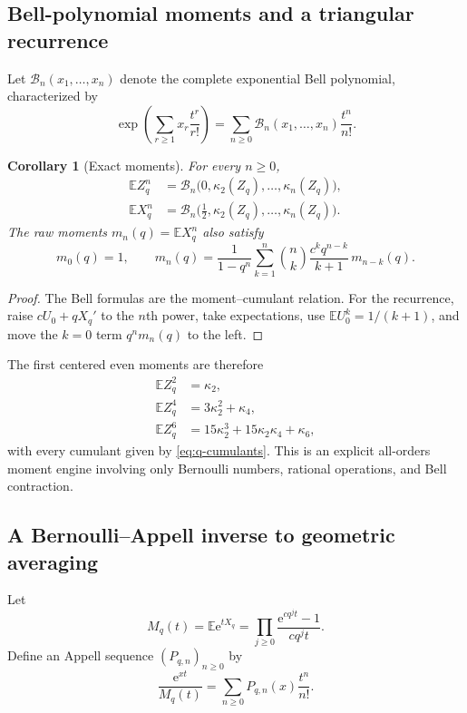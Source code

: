 \documentclass[11pt,oneside]{article}
\newtheorem{corollary}[theorem]{Corollary}
\theoremstyle{definition}
\theoremstyle{remark}
\newcommand{\E}{\mathbb E}
\newcommand{\e}{\mathrm e}
\begin{document}
\subsection{Bell-polynomial moments and a triangular recurrence}

Let $\mathcal B_n(x_1,\ldots,x_n)$ denote the complete exponential Bell polynomial,
characterized by
\[
 \exp\left(\sum_{r\ge1}x_r\frac{t^r}{r!}\right)
 =\sum_{n\ge0}\mathcal B_n(x_1,\ldots,x_n)\frac{t^n}{n!}.
\]

\begin{corollary}[Exact moments]
\label{cor:bell-moments}
For every $n\ge0$,
\begin{align}
 \E Z_q^n
 &=\mathcal B_n\bigl(0,\kappa_2(Z_q),\ldots,\kappa_n(Z_q)\bigr),  \label{eq:centered-bell}\\
 \E X_q^n
 &=\mathcal B_n\bigl(\tfrac12,\kappa_2(Z_q),\ldots,\kappa_n(Z_q)\bigr). \label{eq:raw-bell}
\end{align}
The raw moments $m_n(q)=\E X_q^n$ also satisfy
\begin{equation}
 m_0(q)=1,
 \qquad
 m_n(q)=\frac{1}{1-q^n}
 \sum_{k=1}^{n}\binom nk\frac{c^kq^{n-k}}{k+1}\,m_{n-k}(q).  \label{eq:moment-recurrence}
\end{equation}
\end{corollary}

\begin{proof}
The Bell formulas are the moment--cumulant relation.  For the recurrence, raise
$cU_0+qX_q'$ to the $n$th power, take expectations, use $\E U_0^k=1/(k+1)$, and move the
$k=0$ term $q^nm_n(q)$ to the left.
\end{proof}

The first centered even moments are therefore
\begin{align*}
 \E Z_q^2&=\kappa_2,\\
 \E Z_q^4&=3\kappa_2^2+\kappa_4,\\
 \E Z_q^6&=15\kappa_2^3+15\kappa_2\kappa_4+\kappa_6,
\end{align*}
with every cumulant given by \eqref{eq:q-cumulants}.  This is an explicit all-orders moment
engine involving only Bernoulli numbers, rational operations, and Bell contraction.

\subsection{A Bernoulli--Appell inverse to geometric averaging}

Let
\begin{equation}
 M_q(t)=\E\e^{tX_q}
 =\prod_{j\ge0}\frac{\e^{cq^jt}-1}{cq^jt}.                   \label{eq:mgf-product}
\end{equation}
Define an Appell sequence $(P_{q,n})_{n\ge0}$ by
\begin{equation}
 \frac{\e^{xt}}{M_q(t)}
 =\sum_{n\ge0}P_{q,n}(x)\frac{t^n}{n!}.                     \label{eq:appell-generating}
\end{equation}
\end{document}

